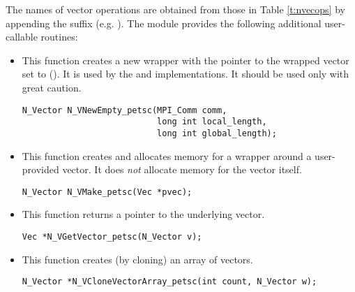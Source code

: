 The names of vector operations are obtained from those in 
Table \ref{t:nvecops} by appending the suffix  (e.g. ).
The module {\nvecpetsc}  provides the following additional user-callable routines:
\begin{itemize}

  

\item {}
 
  This function creates a new {\nvector} wrapper with the pointer to
  the wrapped {\petsc} vector set to (). It is used by the 
   and  implementations. 
  It should be used only with great caution.

\begin{verbatim}
N_Vector N_VNewEmpty_petsc(MPI_Comm comm, 
                           long int local_length, 
                           long int global_length);
\end{verbatim}

  

\item {}
  
  This function creates and allocates memory for a {\nvecpetsc}
  wrapper around a user-provided {\petsc} vector. It does {\em not} 
  allocate memory for the vector  itself.

\begin{verbatim}
N_Vector N_VMake_petsc(Vec *pvec);
\end{verbatim}


\item {}
  
  This function returns a pointer to the underlying {\petsc} vector.

\begin{verbatim}
Vec *N_VGetVector_petsc(N_Vector v);
\end{verbatim}



\item {}
 
  This function creates (by cloning) an array of  {\nvecpetsc} vectors.
 
\begin{verbatim}
N_Vector *N_VCloneVectorArray_petsc(int count, N_Vector w);
\end{verbatim}


\end{itemize}

